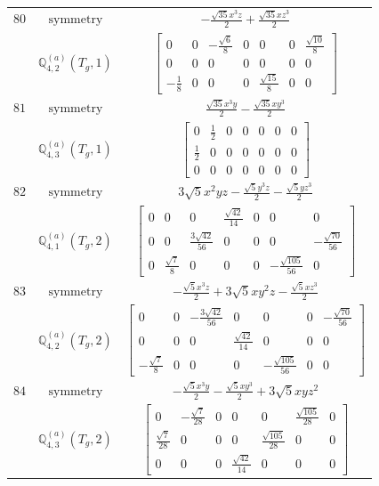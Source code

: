 \documentclass[fleqn,8pt,landscape]{jsarticle}
\begin{document}
\begin{longtable}{ccc}
$ 80 $ & $ \text{symmetry} $ & $ - \frac{\sqrt{35} x^{3} z}{2} + \frac{\sqrt{35} x z^{3}}{2} $ \\
$  $ & $ \mathbb{Q}_{4,2}^{(a)}(T_{g},1) $ & $ \begin{bmatrix} 0 & 0 & - \frac{\sqrt{6}}{8} & 0 & 0 & 0 & \frac{\sqrt{10}}{8} \\ 0 & 0 & 0 & 0 & 0 & 0 & 0 \\ - \frac{1}{8} & 0 & 0 & 0 & \frac{\sqrt{15}}{8} & 0 & 0 \end{bmatrix} $ \\ \hline
$ 81 $ & $ \text{symmetry} $ & $ \frac{\sqrt{35} x^{3} y}{2} - \frac{\sqrt{35} x y^{3}}{2} $ \\
$  $ & $ \mathbb{Q}_{4,3}^{(a)}(T_{g},1) $ & $ \begin{bmatrix} 0 & \frac{1}{2} & 0 & 0 & 0 & 0 & 0 \\ \frac{1}{2} & 0 & 0 & 0 & 0 & 0 & 0 \\ 0 & 0 & 0 & 0 & 0 & 0 & 0 \end{bmatrix} $ \\ \hline
$ 82 $ & $ \text{symmetry} $ & $ 3 \sqrt{5} x^{2} y z - \frac{\sqrt{5} y^{3} z}{2} - \frac{\sqrt{5} y z^{3}}{2} $ \\
$  $ & $ \mathbb{Q}_{4,1}^{(a)}(T_{g},2) $ & $ \begin{bmatrix} 0 & 0 & 0 & \frac{\sqrt{42}}{14} & 0 & 0 & 0 \\ 0 & 0 & \frac{3 \sqrt{42}}{56} & 0 & 0 & 0 & - \frac{\sqrt{70}}{56} \\ 0 & \frac{\sqrt{7}}{8} & 0 & 0 & 0 & - \frac{\sqrt{105}}{56} & 0 \end{bmatrix} $ \\ \hline
$ 83 $ & $ \text{symmetry} $ & $ - \frac{\sqrt{5} x^{3} z}{2} + 3 \sqrt{5} x y^{2} z - \frac{\sqrt{5} x z^{3}}{2} $ \\
$  $ & $ \mathbb{Q}_{4,2}^{(a)}(T_{g},2) $ & $ \begin{bmatrix} 0 & 0 & - \frac{3 \sqrt{42}}{56} & 0 & 0 & 0 & - \frac{\sqrt{70}}{56} \\ 0 & 0 & 0 & \frac{\sqrt{42}}{14} & 0 & 0 & 0 \\ - \frac{\sqrt{7}}{8} & 0 & 0 & 0 & - \frac{\sqrt{105}}{56} & 0 & 0 \end{bmatrix} $ \\ \hline
$ 84 $ & $ \text{symmetry} $ & $ - \frac{\sqrt{5} x^{3} y}{2} - \frac{\sqrt{5} x y^{3}}{2} + 3 \sqrt{5} x y z^{2} $ \\
$  $ & $ \mathbb{Q}_{4,3}^{(a)}(T_{g},2) $ & $ \begin{bmatrix} 0 & - \frac{\sqrt{7}}{28} & 0 & 0 & 0 & \frac{\sqrt{105}}{28} & 0 \\ \frac{\sqrt{7}}{28} & 0 & 0 & 0 & \frac{\sqrt{105}}{28} & 0 & 0 \\ 0 & 0 & 0 & \frac{\sqrt{42}}{14} & 0 & 0 & 0 \end{bmatrix} $ \\ \hline

\end{longtable}
\end{document}
